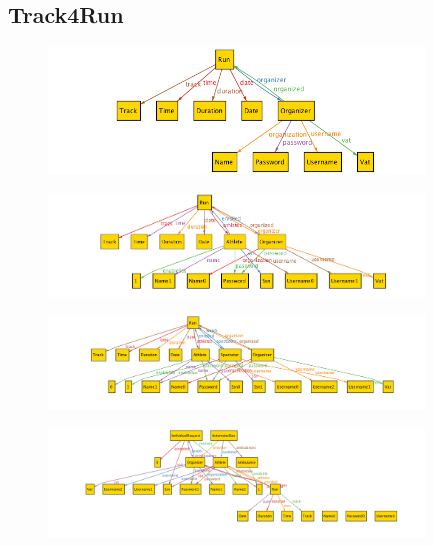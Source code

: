 \documentclass[a4paper]{article}
\begin{document}
\subsection{Track4Run}
    
    
    
    \begin{figure}[!htpb]
    	\centering
    	\includegraphics[width=100mm]{images/alloy/createRun.png}
    \end{figure}
    
    
    \begin{figure}[!htpb]
    	\centering
    	\includegraphics[width=100mm]{images/alloy/enrollRun.png}
    \end{figure}
    
    
    \begin{figure}[!htpb]
    	\centering
    	\includegraphics[width=100mm]{images/alloy/watchRun.png}
    \end{figure}
    
    
    \begin{figure}[!htpb]
    	\centering
    	\includegraphics[width=100mm]{images/alloy/trackMe.png}
    \end{figure}
\newpage
\end{document}
